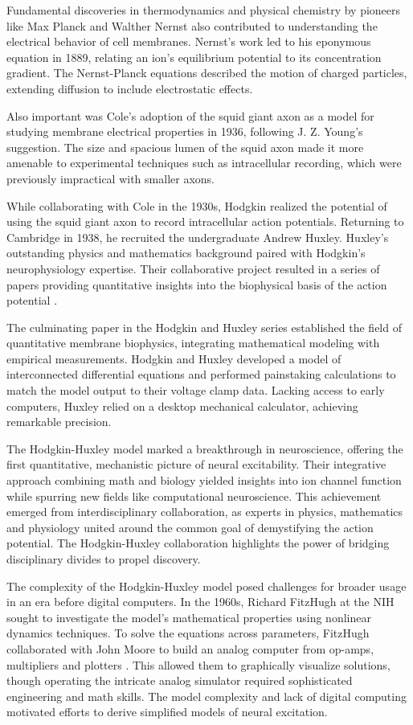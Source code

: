 Fundamental discoveries in thermodynamics and physical chemistry by pioneers like Max Planck and Walther Nernst also contributed to understanding the electrical behavior of cell membranes. Nernst's work led to his eponymous equation in 1889, relating an ion's equilibrium potential to its concentration gradient. The Nernst-Planck equations described the motion of charged particles, extending diffusion to include electrostatic effects.

 Also important was Cole's adoption of the squid giant axon as a model for studying membrane electrical properties in 1936, following J. Z. Young's suggestion. The size and spacious lumen of the squid axon made it more amenable to experimental techniques such as intracellular recording, which were previously impractical with smaller axons. 
 
 While collaborating with Cole in the 1930s, Hodgkin realized the potential of using the squid giant axon to record intracellular action potentials. Returning to Cambridge in 1938, he recruited the undergraduate Andrew Huxley. Huxley's outstanding physics and mathematics background paired with Hodgkin's neurophysiology expertise. Their collaborative project resulted in a series of papers providing quantitative insights into the biophysical basis of the action potential \citep{Brown2020}.

The culminating paper in the Hodgkin and Huxley series established the field of quantitative membrane biophysics, integrating mathematical modeling with empirical measurements. Hodgkin and Huxley developed a model of interconnected differential equations and performed painstaking calculations to match the model output to their voltage clamp data. Lacking access to early computers, Huxley relied on a desktop mechanical calculator, achieving remarkable precision.

The Hodgkin-Huxley model marked a breakthrough in neuroscience, offering the first quantitative, mechanistic picture of neural excitability. Their integrative approach combining math and biology yielded insights into ion channel function while spurring new fields like computational neuroscience. This achievement emerged from interdisciplinary collaboration, as experts in physics, mathematics and physiology united around the common goal of demystifying the action potential. The Hodgkin-Huxley collaboration highlights the power of bridging disciplinary divides to propel discovery.

The complexity of the Hodgkin-Huxley model posed challenges for broader usage in an era before digital computers. In the 1960s, Richard FitzHugh at the NIH sought to investigate the model's mathematical properties using nonlinear dynamics techniques. To solve the equations across parameters, FitzHugh collaborated with John Moore to build an analog computer from op-amps, multipliers and plotters \citep{Izhikevich2006}. This allowed them to graphically visualize solutions, though operating the intricate analog simulator required sophisticated engineering and math skills. The model complexity and lack of digital computing motivated efforts to derive simplified models of neural excitation.


